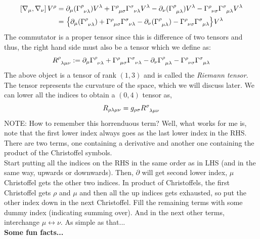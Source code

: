 \begin{align*}
     \comtr{\covd{\mu}}{\covd{\nu}}V^\rho &=\partial_\mu(\chris{\rho}{\nu}{\lambda})V^\lambda + \chris{\rho}{\mu}{\sigma}\chris{\sigma}{\nu}{\lambda}V^\lambda - \partial_\nu(\chris{\rho}{\mu}{\lambda})V^\lambda - \chris{\rho}{\nu}{\sigma}\chris{\sigma}{\mu}{\lambda}V^\lambda\\
     &=\qty{\partial_\mu(\chris{\rho}{\nu}{\lambda}) + \chris{\rho}{\mu}{\sigma}\chris{\sigma}{\nu}{\lambda} - \partial_\nu(\chris{\rho}{\mu}{\lambda}) - \chris{\rho}{\nu}{\sigma}\chris{\sigma}{\mu}{\lambda}}V^\lambda
\end{align*}
The commutator is a proper tensor since this is difference of two tensors and thus, the right hand side must also be a tensor which we define as:
\begin{equation}\label{eqn:riemann}
    \tensor{R}{^\rho _{\lambda\mu\nu}} :=\partial_\mu\chris{\rho}{\nu}{\lambda} + \chris{\rho}{\mu}{\sigma}\chris{\sigma}{\nu}{\lambda} - \partial_\nu\chris{\rho}{\mu}{\lambda} - \chris{\rho}{\nu}{\sigma}\chris{\sigma}{\mu}{\lambda}
\end{equation}
The above object is a tensor of rank $(1,3)$ and is called the \textit{Riemann tensor}. The tensor represents the curvature of the space, which we will discuss later. We can lower all the indices to obtain a $(0,4)$ tensor as,
$$R_{\rho\lambda\mu\nu} =g_{\rho \sigma} \tensor{R}{^\sigma _{\lambda\mu\nu}}$$
NOTE: How to remember this horrenduous term? Well, what works for me is, note that the first lower index always goes as the last lower index in the RHS. There are two terms, one containing a derivative and another one containing the product of the Christoffel symbols. \\[0.2cm]
Start putting all the indices on the RHS in the same order as in LHS (and in the same way, upwards or downwards). Then, $\partial$ will get second lower index, $\mu$  Christoffel gets the other two indices. In product of Christoffels, the first Christoffel gets $\rho$ and $\mu$ and then all the up indices gets exhausted, so put the other index down in the next Christoffel. Fill the remaining terms with some dummy index (indicating summing over). And in the next other terms, interchange $\mu\leftrightarrow \nu$. As simple as that...\\[0.2cm]
\textbf{Some fun facts...}
